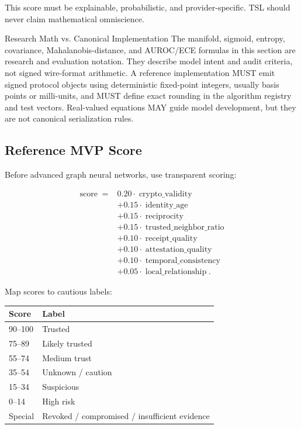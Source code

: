 \documentclass[11pt]{article}
\newcommand{\TSL}{\textsc{TSL}}
\begin{document}
This score must be explainable, probabilistic, and provider-specific. \TSL{} should never claim mathematical omniscience.

\begin{warningbox}{Research Math vs. Canonical Implementation}
The manifold, sigmoid, entropy, covariance, Mahalanobis-distance, and AUROC/ECE formulas in this section are research and evaluation notation. They describe model intent and audit criteria, not signed wire-format arithmetic. A reference implementation MUST emit signed protocol objects using deterministic fixed-point integers, usually basis points or milli-units, and MUST define exact rounding in the algorithm registry and test vectors. Real-valued equations MAY guide model development, but they are not canonical serialization rules.
\end{warningbox}

\subsection{Reference MVP Score}

Before advanced graph neural networks, use transparent scoring:

\begin{align}
\operatorname{score} ={}&
    0.20 \cdot \operatorname{crypto\_validity} \\
& + 0.15 \cdot \operatorname{identity\_age} \\
& + 0.15 \cdot \operatorname{reciprocity} \\
& + 0.15 \cdot \operatorname{trusted\_neighbor\_ratio} \\
& + 0.10 \cdot \operatorname{receipt\_quality} \\
& + 0.10 \cdot \operatorname{attestation\_quality} \\
& + 0.10 \cdot \operatorname{temporal\_consistency} \\
& + 0.05 \cdot \operatorname{local\_relationship}.
\end{align}

Map scores to cautious labels:

\begin{center}
\begin{tabular}{ll}
\toprule
Score & Label \\
\midrule
90--100 & Trusted \\
75--89 & Likely trusted \\
55--74 & Medium trust \\
35--54 & Unknown / caution \\
15--34 & Suspicious \\
0--14 & High risk \\
Special & Revoked / compromised / insufficient evidence \\
\bottomrule
\end{tabular}
\end{center}
\end{document}
